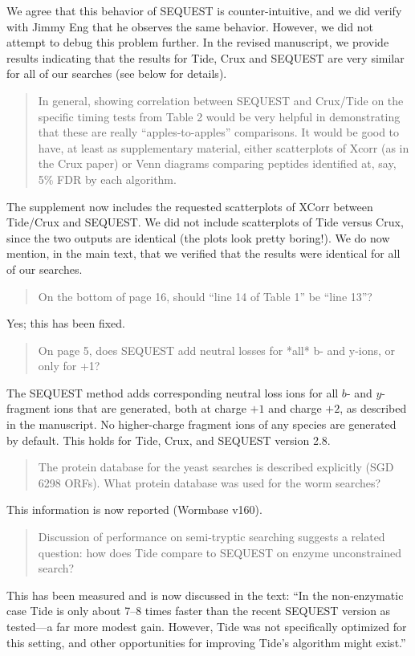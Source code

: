\documentclass{article}
\newcommand{\breview}{\begin{quotation}\begin{em}\noindent}
\newcommand{\ereview}{\end{em}\end{quotation}}
\begin{document}
We agree that this behavior of SEQUEST is counter-intuitive, and we
did verify with Jimmy Eng that he observes the same behavior.
However, we did not attempt to debug this problem further.  In the
revised manuscript, we provide results indicating that the results for
Tide, Crux and SEQUEST are very similar for all of our searches (see
below for details).

\breview In general, showing correlation between SEQUEST and Crux/Tide
on the specific timing tests from Table 2 would be very helpful in
demonstrating that these are really ``apples-to-apples'' comparisons. It
would be good to have, at least as supplementary material, either
scatterplots of Xcorr (as in the Crux paper) or Venn diagrams
comparing peptides identified at, say, 5\% FDR by each
algorithm. \ereview

The supplement now includes the requested scatterplots of XCorr
between Tide/Crux and SEQUEST.  We did not include scatterplots of
Tide versus Crux, since the two outputs are identical (the plots look
pretty boring!).  We do now mention, in the main text, that we
verified that the results were identical for all of our searches.

\breview On the bottom of page 16, should ``line 14 of Table 1'' be
``line 13''? \ereview

Yes; this has been fixed.

\breview On page 5, does SEQUEST add neutral losses for *all* b- and
y-ions, or only for +1? \ereview

The SEQUEST method adds corresponding neutral loss ions for all $b$-
and $y$- fragment ions that are generated, both at charge $+1$ and
charge $+2$, as described in the manuscript. No higher-charge fragment
ions of any species are generated by default. This holds for Tide,
Crux, and SEQUEST version 2.8.

\breview The protein database for the yeast searches is described
explicitly (SGD 6298 ORFs). What protein database was used for the
worm searches? \ereview

This information is now reported (Wormbase v160).

\breview Discussion of performance on semi-tryptic searching suggests
a related question: how does Tide compare to SEQUEST on enzyme
unconstrained search? \ereview

This has been measured and is now discussed in the text:
``In the non-enzymatic case Tide is only about 7--8 times faster than the recent
SEQUEST version as tested---a far more modest gain. However, Tide was not
specifically optimized for this setting, and other opportunities for improving
Tide's algorithm might exist.''
\end{document}
